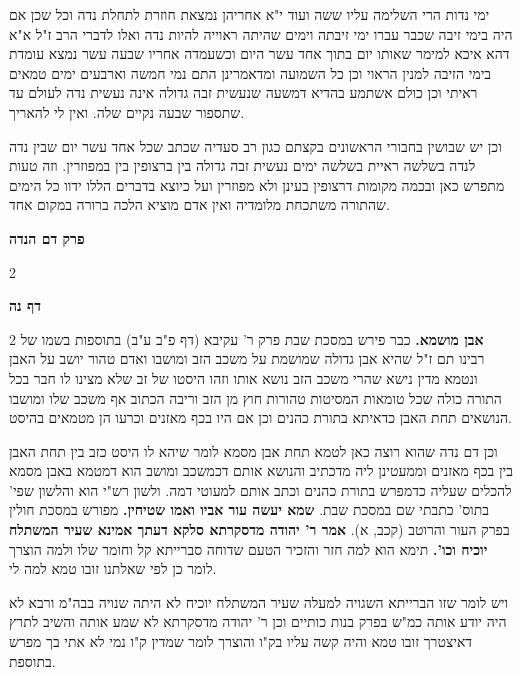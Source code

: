 \documentclass[12pt, openany]{book}
\newcommand{\sethebfont}{
\fontsize{10.5pt}{21.0pt} \selectfont
}
\newcommand{\twocol}[1]{
	{\sethebfont \begin{multicols}{2}
			#1
	\end{multicols}}	
}
\newcommand{\chapname}{}
\newcommand{\sectname}{}
\newcommand{\newchap}[1]{
	\addcontentsline{toc}{chapter}{#1}
	\renewcommand{\chapname}{#1}
		\begin{center}
			\textbf{%
\fontsize{16pt}{16pt}\selectfont
				#1}
		\end{center}
}
\newcommand{\newsection}[1]{
	\renewcommand{\sectname}{#1}	
	\vspace{-\baselineskip}
	\begin{center}
		\textbf{%
\fontsize{16pt}{16pt}\selectfont
			#1}
	\end{center}
	\vspace{-\baselineskip}
	\nopagebreak
}
\begin{document}
{ימי נדות הרי השלימה עליו ששה ועוד י"א אחריהן נמצאת חוזרת לתחלת נדה וכל שכן אם היה בימי זיבה שכבר עברו ימי זיבתה וימים שהיתה ראוייה להיות נדה ואלו לדברי הרב ז"ל א"א דהא איכא למימר שאותו יום בתוך אחד עשר היום וכשעמדה אחריו שבעה עשר נמצא עומדת בימי הזיבה למנין הראוי וכן כל השמועה ומדאמרינן התם נמי חמשה וארבעים ימים טמאים ראיתי וכן כולם אשתמע בהדיא דמשעה שנעשית זבה גדולה אינה נעשית נדה לעולם עד שתספור שבעה נקיים שלה. ואין לי להאריך.\par וכן יש שבושין בחבורי הראשונים בקצתם כגון רב סעדיה שכתב שכל אחד עשר יום שבין נדה לנדה בשלשה ראיית בשלשה ימים נעשית זבה גדולה בין ברצופין בין במפוזרין. וזה טעות מתפרש כאן ובכמה מקומות דרצופין בעינן ולא מפוזרין ועל כיוצא בדברים הללו ידוו כל הימים שהתורה משתכחת מלומדיה ואין אדם מוציא הלכה ברורה במקום אחד. }

\newchap{פרק  דם הנדה}
\twocol{\clearpage}

\newsection{דף נה}
\twocol{\textbf{אבן מושמא.} כבר פירש במסכת שבת פרק ר' עקיבא (דף פ"ב ע"ב) בתוספות בשמו של רבינו תם ז"ל שהיא אבן גדולה שמושמת על משכב הזב ומושבו ואדם טהור יושב על האבן ונטמא מדין נישא שהרי משכב הזב נושא אותו וזהו היסטו של זב שלא מצינו לו חבר בכל התורה כולה שכל טומאות המסיטות טהורות חוץ מן הזב וריבה הכתוב אף משכב שלו ומושבו הנושאים תחת האבן כדאיתא בתורת כהנים וכן אם היו בכף מאזנים וכרעו הן מטמאים בהיסט.\par וכן דם נדה שהוא רוצה כאן לטמא תחת אבן מסמא לומר שיהא לו היסט כזב בין תחת האבן בין בכף מאזנים וממעטינן ליה מדכתיב והנושא אותם דכמשכב ומושב הוא דמטמא באבן מסמא להכלים שעליה כדמפרש בתורת כהנים וכתב אותם למעוטי דמה. ולשון רש"י הוא והלשון שפי' בתוס' כתבתי שם במסכת שבת. 
\textbf{שמא יעשה עור אביו ואמו שטיחין.} מפורש במסכת חולין בפרק העור והרוטב (קכב, א). 
\textbf{אמר ר' יהודה מדסקרתא סלקא דעתך אמינא שעיר המשתלח יוכיח וכו'.} תימא הוא למה חזר והזכיר הטעם שדוחה סברייתא קל וחומר שלו ולמה הוצרך לומר כן לפי שאלתנו זובו טמא למה לי.\par ויש לומר שזו הברייתא השגויה למעלה שעיר המשתלח יוכיח לא היתה שנויה בבה"מ ורבא לא היה יודע אותה כמ"ש בפרק בנות כותיים וכן ר' יהודה מדסקרתא לא שמע אותה והשיב לתרץ דאיצטרך זובו טמא והיה קשה עליו בק"ו והוצרך לומר שמדין ק"ו נמי לא אתי בך מפרש בתוספת. 
\clearpage}
\end{document}
